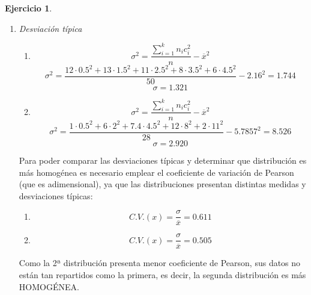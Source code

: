 \documentclass[a4paper, 12pt]{article}
\theoremstyle{definition}
\newtheorem{ej}{Ejercicio}
\begin{document}
\begin{ej}
\begin{enumerate}[label=\textit{\alph*)}]
\begin{enumerate}[label=\arabic*)]
    \item \textit{Desviación típica}
    
    \begin{enumerate}[label=(\arabic*)]
        \item 
        \[
            \sigma^2 = \frac{\sum_{i=1}^{k}n_ic_i^2}{n} - \overline{x}^2  
        \]
        \[
        \sigma^2 = \frac{12 \cdot 0.5^2 + 13 \cdot 1.5^2 + 11 \cdot 2.5^2 + 8 \cdot 3.5^2 + 6 \cdot 4.5^2}{50} - 2.16^2 = 1.744
        \]
        \[
        \sigma = 1.321
        \]
        
        \item
        \[
            \sigma^2 = \frac{\sum_{i=1}^{k}n_ic_i^2}{n} - \overline{x}^2  
        \]
        \[
        \sigma^2 = \frac{1 \cdot 0.5^2 + 6 \cdot 2^2 + 7.4 \cdot 4.5^2 + 12 \cdot 8^2 + 2 \cdot 11^2}{28} - 5.7857^2 = 8.526
        \]
        \[
        \sigma = 2.920
        \]
    \end{enumerate}
    
    Para poder comparar las desviaciones típicas y determinar que distribución es más homogénea es necesario emplear el coeficiente de variación de Pearson (que es adimensional), ya que las distribuciones presentan distintas medidas y desviaciones típicas:
    \begin{enumerate}[label=(\arabic*)]
        \item 
        \[
        C.V.(x) = \frac{\sigma}{\overline{x}} = 0.611
        \]
        \item
        \[
        C.V.(x) = \frac{\sigma}{\overline{x}} = 0.505
        \]
    \end{enumerate}
    
         Como la 2ª distribución presenta menor coeficiente de Pearson, sus datos no están tan repartidos como la primera, es decir, la segunda distribución es más HOMOGÉNEA.
     \end{enumerate}
    
\end{enumerate}
\end{ej}
\end{document}
